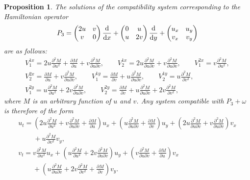\documentclass[10pt,a4paper]{amsart}
\numberwithin{equation}{section}
\newtheorem{Proposition}[Theorem]{Proposition}
 { \theoremstyle{definition}
\newtheorem{Definition}[Theorem]{Definition}
\newtheorem{Note}[Theorem]{Note}
\newtheorem{Example}[Theorem]{Example}
\newtheorem{Remark}[Theorem]{Remark} }
\begin{document}
\begin{Proposition}\label{proposition4.4}
The solutions of the compatibility system corresponding to the Hamiltonian operator
\begin{gather*}
P_3=\begin{pmatrix} 2u&v\\v&0\\ \end{pmatrix} \frac{\rm d}{{\rm d}x}+\begin{pmatrix} 0&u\\u&2v\\ \end{pmatrix} \frac{\rm d}{{\rm d}y}+\begin{pmatrix} u_x&u_y\\v_x&v_y\\ \end{pmatrix}
\end{gather*}
are as follows:
\begin{gather*}
 V^{1x}_1=2u\frac{\partial^2M}{\partial u^2}+\frac{\partial M}{\partial u}+v\frac{\partial^2M}{\partial u \partial v}, \qquad V^{1x}_2=2u\frac{\partial^2M}{\partial u \partial v}+v\frac{\partial^2M}{\partial u \partial v},\qquad
 V^{2x}_1=v\frac{\partial^2M}{\partial u^2}, \\ V^{2x}_2=\frac{\partial M}{\partial u}+v\frac{\partial^2M}{\partial u \partial v}, \qquad
 V^{1y}_1=\frac{\partial M}{\partial v}+u\frac{\partial^2M}{\partial u \partial v}, \qquad V^{1y}_2=u\frac{\partial^2M}{\partial v^2}, \\
 V^{2y}_1=u\frac{\partial^2M}{\partial u^2}+2v\frac{\partial^2M}{\partial u \partial v} ,
 \qquad V^{2y}_2=\frac{\partial M}{\partial v}+u\frac{\partial^2M}{\partial u\partial v}+2v\frac{\partial^2M}{\partial v^2},
\end{gather*}
where $M$ is an arbitrary function of $u$ and $v$. Any system compatible with $P_3+\omega$ is therefore of the form
\begin{gather*}
u_t=\left(2u\frac{\partial^2 M}{\partial u^2}+v\frac{\partial^2 M}{\partial u\partial v}+\frac{\partial M}{\partial u}\right)u_x+\left(u\frac{\partial^2 M}{\partial u\partial v}+\frac{\partial M}{\partial v}\right) u_y+\left(2u\frac{\partial^2 M}{\partial u\partial v}+v\frac{\partial^2M}{\partial u\partial v}\right)v_x\\
\phantom{u_t=}{}+
u\frac{\partial^2 M}{\partial v^2}v_y,\\
v_t=v\frac{\partial^2 M}{\partial u^2}u_x+\left(u\frac{\partial^2 M}{\partial u^2}+2v\frac{\partial^2 M}{\partial u\partial v}\right) u_y+\left(v\frac{\partial^2 M}{\partial u\partial v}+\frac{\partial M}{\partial u}\right)v_x\\
\phantom{v_t=}{}
+\left(u\frac{\partial^2 M}{\partial u\partial v}+2v\frac{\partial^2 M}{\partial v^2}+\frac{\partial M}{\partial v}\right)v_y.
\end{gather*}
\end{Proposition}
\end{document}
